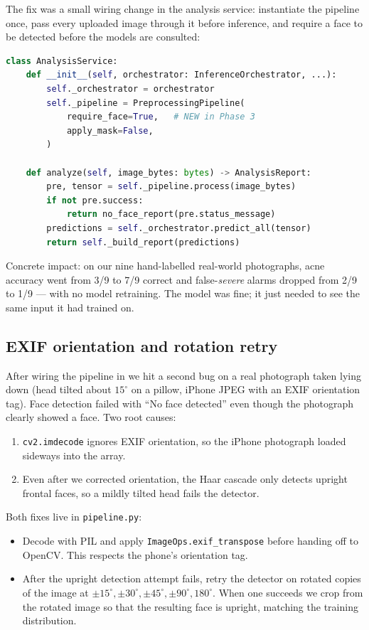 \documentclass[11pt,a4paper,oneside]{report}
\begin{document}
The fix was a small wiring change in the analysis service:
instantiate the pipeline once, pass every uploaded image through
it before inference, and require a face to be detected before the
models are consulted:

\begin{lstlisting}[language=Python,caption={Wiring the preprocessing pipeline into the analysis service.}]
class AnalysisService:
    def __init__(self, orchestrator: InferenceOrchestrator, ...):
        self._orchestrator = orchestrator
        self._pipeline = PreprocessingPipeline(
            require_face=True,   # NEW in Phase 3
            apply_mask=False,
        )

    def analyze(self, image_bytes: bytes) -> AnalysisReport:
        pre, tensor = self._pipeline.process(image_bytes)
        if not pre.success:
            return no_face_report(pre.status_message)
        predictions = self._orchestrator.predict_all(tensor)
        return self._build_report(predictions)
\end{lstlisting}

Concrete impact: on our nine hand-labelled real-world photographs,
acne accuracy went from 3/9 to 7/9 correct and false-\emph{severe}
alarms dropped from 2/9 to 1/9 --- with no model retraining. The
model was fine; it just needed to see the same input it had trained
on.

\subsection{EXIF orientation and rotation retry}\label{sec:rotation}
After wiring the pipeline in we hit a second bug on a real photograph
taken lying down (head tilted about \(15^\circ\) on a pillow, iPhone
JPEG with an EXIF orientation tag). Face detection failed with
``No face detected'' even though the photograph clearly showed a
face. Two root causes:

\begin{enumerate}
    \item \texttt{cv2.imdecode} ignores EXIF orientation, so the
        iPhone photograph loaded sideways into the array.
    \item Even after we corrected orientation, the Haar cascade only
        detects upright frontal faces, so a mildly tilted head fails
        the detector.
\end{enumerate}

Both fixes live in \texttt{pipeline.py}:

\begin{itemize}
    \item Decode with PIL and apply
        \texttt{ImageOps.exif\_transpose} before handing off to
        OpenCV. This respects the phone's orientation tag.
    \item After the upright detection attempt fails, retry the
        detector on rotated copies of the image at
        \(\pm 15^\circ, \pm 30^\circ, \pm 45^\circ, \pm 90^\circ,
        180^\circ\). When one succeeds we crop from the rotated
        image so that the resulting face is upright, matching the
        training distribution.
\end{itemize}
\end{document}
